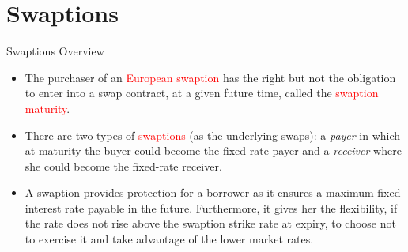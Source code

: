 \documentclass{beamer}
\begin{document}

\section{Swaptions}
\begin{frame}{Swaptions Overview}
\begin{itemize}
	\item<1-> The purchaser of an \textcolor{red}{European swaption} has the right but not the obligation to enter into a swap contract, at a given future time, called the \textcolor{red}{swaption maturity}.
	\item<2-> There are two types of \textcolor{red}{swaptions} (as the underlying swaps): a \emph{payer} in which at maturity the buyer could become the fixed-rate payer and a \emph{receiver} where she could become the fixed-rate receiver.
	\item<3-> A swaption provides protection for a borrower as it ensures a maximum fixed interest rate payable in the future. Furthermore, it gives her the flexibility, if the rate does not rise above the swaption strike rate at expiry, to choose not to exercise it and take advantage of the lower market rates.
\end{itemize}
\end{frame}
\end{document}
